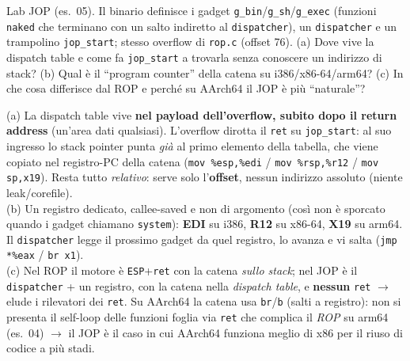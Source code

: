 \question[7]
Lab JOP (es.\ 05). Il binario definisce i gadget \lstinline|g_bin|/\lstinline|g_sh|/\lstinline|g_exec| (funzioni \lstinline|naked| che terminano con un salto indiretto al \lstinline|dispatcher|), un \lstinline|dispatcher| e un trampolino \lstinline|jop_start|; stesso overflow di \lstinline|rop.c| (offset 76).
(a) Dove vive la dispatch table e come fa \lstinline|jop_start| a trovarla senza conoscere un indirizzo di stack? (b) Qual è il ``program counter'' della catena su i386/x86-64/arm64? (c) In che cosa differisce dal ROP e perché su AArch64 il JOP è più ``naturale''?
\begin{solution}
(a) La dispatch table vive \textbf{nel payload dell'overflow, subito dopo il return address} (un'area dati qualsiasi). L'overflow dirotta il \lstinline|ret| su \lstinline|jop_start|: al suo ingresso lo stack pointer punta \emph{già} al primo elemento della tabella, che viene copiato nel registro-PC della catena (\lstinline|mov %esp,%edi| / \lstinline|mov %rsp,%r12| / \lstinline|mov sp,x19|). Resta tutto \emph{relativo}: serve solo l'\textbf{offset}, nessun indirizzo assoluto (niente leak/corefile).\\
(b) Un registro dedicato, callee-saved e non di argomento (così non è sporcato quando i gadget chiamano \lstinline|system|): \textbf{EDI} su i386, \textbf{R12} su x86-64, \textbf{X19} su arm64. Il \lstinline|dispatcher| legge il prossimo gadget da quel registro, lo avanza e vi salta (\lstinline|jmp *%eax| / \lstinline|br x1|).\\
(c) Nel ROP il motore è \lstinline|ESP|+\lstinline|ret| con la catena \emph{sullo stack}; nel JOP è il \lstinline|dispatcher| + un registro, con la catena nella \emph{dispatch table}, e \textbf{nessun} \lstinline|ret| $\to$ elude i rilevatori dei \lstinline|ret|. Su AArch64 la catena usa \lstinline|br|/\lstinline|b| (salti a registro): non si presenta il self-loop delle funzioni foglia via \lstinline|ret| che complica il \emph{ROP} su arm64 (es.\ 04) $\to$ il JOP è il caso in cui AArch64 funziona meglio di x86 per il riuso di codice a più stadi.
\end{solution}
